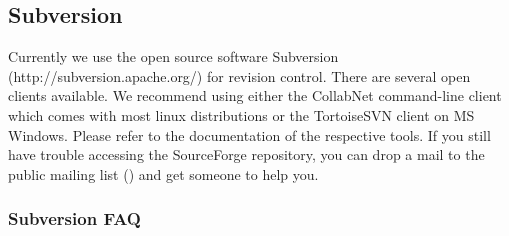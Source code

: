 \subsection{Subversion}
Currently we use the open source software Subversion (http://subversion.apache.org/) for revision control.
There are several open clients available.
We recommend using either the CollabNet command-line client which comes with most linux distributions or the TortoiseSVN client on MS Windows.
Please refer to the documentation of the respective tools.
If you still have trouble accessing the SourceForge repository, you can drop a mail to the public mailing list () and get someone to help you.

\subsubsection{Subversion FAQ}

